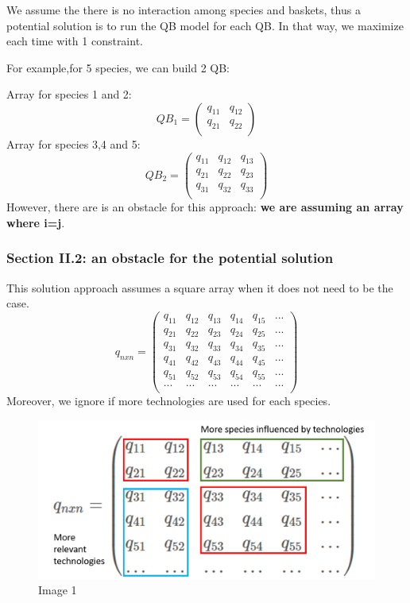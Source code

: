\documentclass[
]{article}
\begin{document}
We assume the there is no interaction among species and baskets, thus a
potential solution is to run the QB model for each QB. In that way, we
maximize each time with 1 constraint.

For example,for 5 species, we can build 2 QB:

Array for species 1 and 2: \[
QB_{1}=
\begin{pmatrix}
q_{11}&q_{12}\\
q_{21}&q_{22}\\
\end{pmatrix}
\] Array for species 3,4 and 5: \[
QB_{2}=
\begin{pmatrix}
q_{11}&q_{12}&q_{13}\\
q_{21}&q_{22}&q_{23}\\
q_{31}&q_{32}&q_{33}\\
\end{pmatrix}
\] However, there are is an obstacle for this approach: \textbf{we are
assuming an array where i=j}.

\hypertarget{section-ii.2-an-obstacle-for-the-potential-solution}{%
\subsubsection{Section II.2: an obstacle for the potential
solution}\label{section-ii.2-an-obstacle-for-the-potential-solution}}

This solution approach assumes a square array when it does not need to
be the case. \[
q_{nxn}=
\begin{pmatrix}
q_{11}&q_{12}&q_{13}&q_{14}&q_{15}&...\\
q_{21}&q_{22}&q_{23}&q_{24}&q_{25}&...\\
q_{31}&q_{32}&q_{33}&q_{34}&q_{35}&...\\
q_{41}&q_{42}&q_{43}&q_{44}&q_{45}&...\\
q_{51}&q_{52}&q_{53}&q_{54}&q_{55}&...\\
...&...&...&...&...&...\\
\end{pmatrix}
\] Moreover, we ignore if more technologies are used for each species.

\begin{figure}
\centering
\includegraphics{array.png}
\caption{Image 1}
\end{figure}
\end{document}
